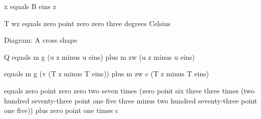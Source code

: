 x equals B eins z

T wz equals zero point zero zero three degrees Celsius

Diagram: A cross shape

Q equals m g (u z minus u eins) plus m zw (u z minus u eins)

equals m g (v (T z minus T eins)) plus m zw c (T z minus T eins)

equals zero point zero zero two seven times (zero point six three three times (two hundred seventy-three point one five three minus two hundred seventy-three point one five)) plus zero point one times c